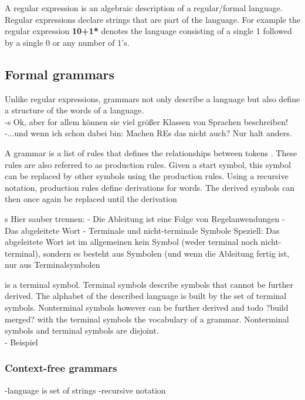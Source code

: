 A regular expression is an algebraic description of a regular/formal language. Regular expressions declare strings that are part of the language. \cite{AutomataTheory.2007} 
For example the regular expression \textbf{10+1*} denotes the language consisting of a single 1 followed by a single 0 or any number of 1's. 

\subsection{Formal grammars}\label{sec:BackgroundGrammar}

Unlike regular expressions, grammars not only describe a language but also define a structure of the words of a language.\\

-s Ok, aber for allem können sie viel größer Klassen von Sprachen beschreiben!
-...und wenn ich schon dabei bin: Machen REs das nicht auch? Nur halt anders.

A grammar is a list of rules that defines the relationships between tokens \cite{LexYacc.1992}.
These rules are also referred to as production rules.
Given a start symbol, this symbol can be replaced by other symbols using the production rules.
Using a recursive notation, production rules define derivations for words. The derived symbols can then once again be replaced until the derivation

s Hier sauber trennen:
- Die Ableitung ist eine Folge von Regelanwendungen
- Das abgeleitete Wort
- Terminale und nicht-terminale Symbole
Speziell: Das abgeleitete Wort ist im allgemeinen kein Symbol
(weder terminal noch nicht-terminal), sondern es besteht aus
Symbolen (und wenn die Ableitung fertig ist, nur aus Terminalsymbolen

is a terminal symbol.  
Terminal symbols describe symbols that cannot be further derived. The alphabet of the described language is built by the set of terminal symbols.
Nonterminal symbols however can be further derived and todo ?build  merged? with the terminal symbols the vocabulary of a grammar. Nonterminal symbols and terminal symbols are disjoint. 
\\
- Beispiel

\subsubsection{Context-free grammars}

-language is set of strings
-recursive notation

